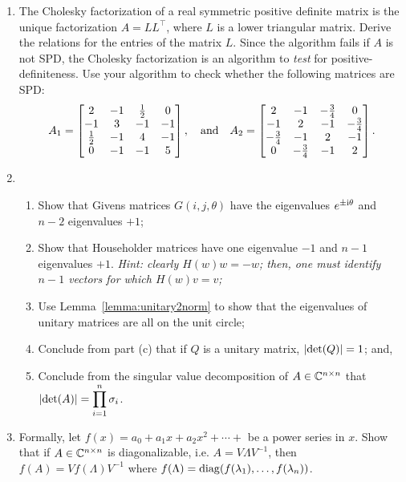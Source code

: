 \begin{enumerate}
\item The Cholesky factorization of a real symmetric positive definite matrix is the unique factorization $A=LL^\top$, where $L$ is a lower triangular matrix. Derive the relations for the entries of the matrix $L$. Since the algorithm fails if $A$ is not SPD, the Cholesky factorization is an algorithm to {\em test} for positive-definiteness. Use your algorithm to check whether the following matrices are SPD:
\[
A_1 = \begin{bmatrix} 2 & -1 & \tfrac{1}{2} & 0\\ -1 & 3 & -1 & -1\\ \tfrac{1}{2} & -1 & 4 & -1\\ 0 & -1 & -1 & 5\end{bmatrix},\quad{\rm and}\quad A_2 = \begin{bmatrix} 2 & -1 & -\tfrac{3}{4} & 0\\ -1 & 2 & -1 & -\tfrac{3}{4}\\ -\tfrac{3}{4} & -1 & 2 & -1\\ 0 & -\tfrac{3}{4} & -1 & 2\end{bmatrix}.
\]

\item \begin{enumerate}

\item Show that Givens matrices $G(i,j,\theta)$ have the eigenvalues $e^{\pm{\rm i}\theta}$ and $n-2$ eigenvalues $+1$;

\item Show that Householder matrices have one eigenvalue $-1$ and $n-1$ eigenvalues $+1$. {\em Hint: clearly $H(w)w=-w$; then, one must identify $n-1$ vectors for which $H(w)v = v$;}

\item Use Lemma~\ref{lemma:unitary2norm} to show that the eigenvalues of unitary matrices are all on the unit circle;

\item Conclude from part (c) that if $Q$ is a unitary matrix, $\left|{\det(Q)}\right| = 1$; and,

\item Conclude from the singular value decomposition of $A\in\mathbb{C}^{n\times n}$ that $\displaystyle \left|{\det(A)}\right| = \prod_{i=1}^n\sigma_i$.

\end{enumerate}

\item Formally, let $f(x) = a_0 + a_1x + a_2x^2 + \cdots +$ be a power series in $x$. Show that if $A\in\mathbb{C}^{n\times n}$ is diagonalizable, i.e. $A=V\Lambda V^{-1}$, then $f(A) = Vf(\Lambda)V^{-1}$ where $f(\Lambda) = \operatorname{diag}(f(\lambda_1),\ldots,f(\lambda_n))$.


\end{enumerate}
